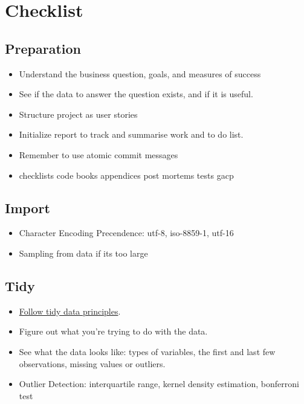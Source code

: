 \documentclass[]{book}
\begin{document}
\section{Checklist}\label{checklist}

\subsection{Preparation}\label{preparation}

\begin{itemize}
\item
  Understand the business question, goals, and measures of success
\item
  See if the data to answer the question exists, and if it is useful.
\item
  Structure project as user stories
\item
  Initialize report to track and summarise work and to do list.
\item
  Remember to use atomic commit messages
\item
  checklists \textbar{} code books \textbar{} appendices \textbar{} post
  mortems \textbar{} tests \textbar{} gacp
\end{itemize}

\subsection{Import}\label{import}

\begin{itemize}
\item
  Character Encoding Precendence: utf-8, iso-8859-1, utf-16
\item
  Sampling from data if its too large
\end{itemize}

\subsection{Tidy}\label{tidy}

\begin{itemize}
\item
  \href{http://vita.had.co.nz/papers/tidy-data.pdf}{Follow tidy data
  principles}.
\item
  Figure out what you're trying to do with the data.
\item
  See what the data looks like: types of variables, the first and last
  few observations, missing values or outliers.
\item
  Outlier Detection: interquartile range, kernel density estimation,
  bonferroni test
\end{itemize}
\end{document}
